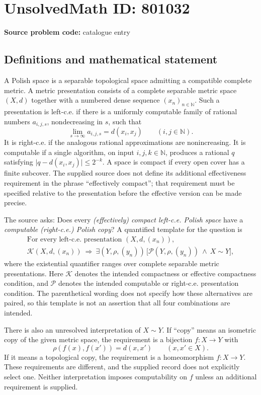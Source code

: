 \documentclass[11pt]{article}
\newcommand{\N}{\mathbb{N}}
\begin{document}
\section*{UnsolvedMath ID: 801032}
\textbf{Source problem code:} catalogue entry
\subsection{Definitions and mathematical statement}
A Polish space is a separable topological space admitting a compatible complete metric. A metric presentation consists of a complete separable metric space \((X,d)\) together with a numbered dense sequence \((x_n)_{n\in\N}\). Such a presentation is left-c.e. if there is a uniformly computable family of rational numbers \(a_{i,j,s}\), nondecreasing in \(s\), such that
\[
\lim_{s\to\infty}a_{i,j,s}=d(x_i,x_j)\qquad(i,j\in\N).
\]
It is right-c.e. if the analogous rational approximations are nonincreasing. It is computable if a single algorithm, on input \(i,j,k\in\N\), produces a rational \(q\) satisfying \(\lvert q-d(x_i,x_j)\rvert\leq 2^{-k}\). A space is compact if every open cover has a finite subcover. The supplied source does not define its additional effectiveness requirement in the phrase ``effectively compact''; that requirement must be specified relative to the presentation before the effective version can be made precise.

The source asks: Does every \emph{(effectively) compact left-c.e. Polish space} have a \emph{computable (right-c.e.) Polish copy}? A quantified template for the question is
\[
\begin{gathered}
\text{For every left-c.e. presentation }(X,d,(x_n)),\\
\mathcal K(X,d,(x_n))\ \Longrightarrow\
\exists (Y,\rho,(y_n))\,
\bigl[\mathcal P(Y,\rho,(y_n))\ \land\ X\sim Y\bigr],
\end{gathered}
\]
where the existential quantifier ranges over complete separable metric presentations. Here \(\mathcal K\) denotes the intended compactness or effective compactness condition, and \(\mathcal P\) denotes the intended computable or right-c.e. presentation condition. The parenthetical wording does not specify how these alternatives are paired, so this template is not an assertion that all four combinations are intended.

There is also an unresolved interpretation of \(X\sim Y\). If ``copy'' means an isometric copy of the given metric space, the requirement is a bijection \(f:X\to Y\) with
\[
\rho(f(x),f(x'))=d(x,x')\qquad(x,x'\in X).
\]
If it means a topological copy, the requirement is a homeomorphism \(f:X\to Y\). These requirements are different, and the supplied record does not explicitly select one. Neither interpretation imposes computability on \(f\) unless an additional requirement is supplied.
\end{document}
